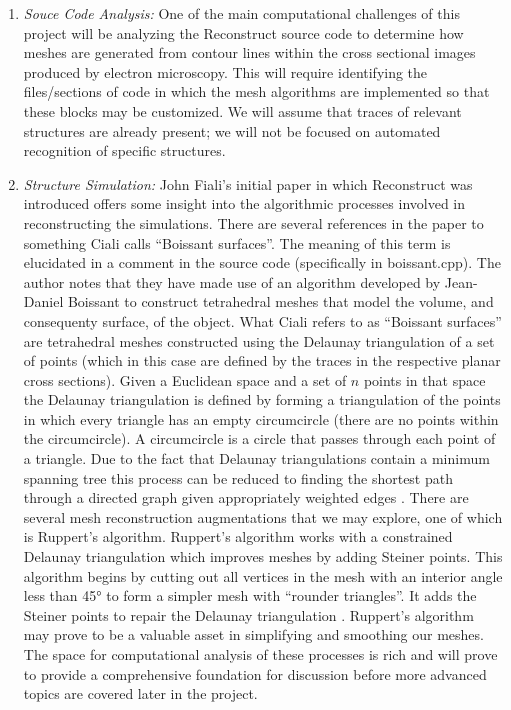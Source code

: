 \documentclass{article}
\begin{document}
\begin{enumerate}
    \item \textit{Souce Code Analysis:}
    One of the main computational challenges of this project will be analyzing the Reconstruct source code to determine how meshes are generated from contour lines within the cross sectional images produced by electron microscopy. This will require identifying the files/sections of code in which the mesh algorithms are implemented so that these blocks may be customized. We will assume that traces of relevant structures are already present; we will not be focused on automated recognition of specific structures.
    \item \textit{Structure Simulation:}
    John Fiali’s initial paper in which Reconstruct was introduced \cite{fiala2005reconstruct} offers some insight into the algorithmic processes involved in reconstructing the simulations. There are several references in the paper to something Ciali calls “Boissant surfaces”. The meaning of this term is elucidated in a comment in the source code (specifically in boissant.cpp). The author notes that they have made use of an algorithm developed by Jean-Daniel Boissant to construct tetrahedral meshes that model the volume, and consequenty surface, of the object. What Ciali refers to as “Boissant surfaces” \cite{fiala2005reconstruct} are tetrahedral meshes constructed using the Delaunay triangulation of a set of points (which in this case are defined by the traces in the respective planar cross sections). Given a Euclidean space and a set of $n$ points in that space the Delaunay triangulation is defined by forming a triangulation of the points in which every triangle has an empty circumcircle (there are no points within the circumcircle). A circumcircle is a circle that passes through each point of a triangle. Due to the fact that Delaunay triangulations contain a minimum spanning tree this process can be reduced to finding the shortest path through a directed graph given appropriately weighted edges \cite{boissonnat1988shape}. There are several mesh reconstruction augmentations that we may explore, one of which is Ruppert’s algorithm. Ruppert's algorithm works with a constrained Delaunay triangulation which improves meshes by adding Steiner points. This algorithm begins by cutting out all vertices in the mesh with an interior angle less than 45° to form a simpler mesh with “rounder triangles”. It adds the Steiner points to repair the Delaunay triangulation \cite{sack1999handbook}. Ruppert’s algorithm may prove to be a valuable asset in simplifying and smoothing our meshes. The space for computational analysis of these processes is rich and will prove to provide a comprehensive foundation for discussion before more advanced topics are covered later in the project.

\end{enumerate}
\end{document}
